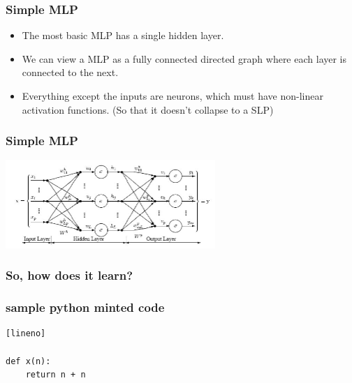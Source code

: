 \documentclass{beamer}
\begin{document}
\begin{frame}
\frametitle{Simple MLP}
\begin{itemize}
\item The most basic MLP has a single hidden layer.
\item We can view a MLP as a fully connected directed graph where each layer is connected to the next.
\item Everything except the inputs are neurons, which must have non-linear activation functions. (So that it doesn't collapse to a SLP)
\end{itemize}
\end{frame}
\begin{frame}
\frametitle{Simple MLP}

\includegraphics[width=300px]{mls.jpg}

\end{frame}

\begin{frame}	
\frametitle{So, how does it learn?}
\end{frame}

\begin{frame}
\frametitle{sample python minted code}
\begin{verbatim}[lineno]

def x(n):
    return n + n

\end{verbatim}

\end{frame}
\end{document}
